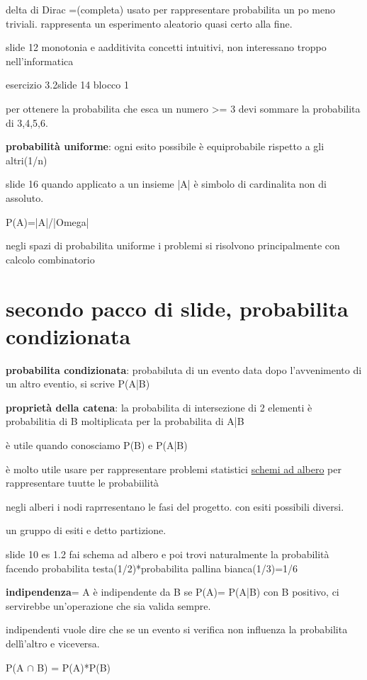 \documentclass[12pt]{article}
\begin{document}
delta di Dirac =(completa) usato per rappresentare probabilita un po meno triviali. rappresenta un esperimento aleatorio quasi certo alla fine.

slide 12 monotonia e aadditivita concetti intuitivi, non interessano troppo nell'informatica

esercizio 3.2slide 14 blocco 1

per ottenere la probabilita che esca un numero >= 3 devi sommare la probabilita di 3,4,5,6.

\textbf{probabilità uniforme}: ogni esito possibile è equiprobabile  rispetto a gli altri(1/n)

slide 16 quando applicato a un insieme |A| è simbolo di cardinalita non di assoluto.

P(A)=|A|/|Omega|


negli spazi di probabilita uniforme i problemi si risolvono principalmente con calcolo combinatorio

\section{secondo pacco di slide, probabilita condizionata}

\textbf{probabilita condizionata}: probabiluta di un evento data dopo l'avvenimento di un altro eventio, si scrive P(A|B)

\textbf{proprietà della catena}: la probabilita di intersezione di 2 elementi è probabilitia di B moltiplicata per la probabilita di A|B

è utile quando conosciamo P(B) e P(A|B)

è molto utile usare per rappresentare problemi statistici \underline{schemi ad albero} per rappresentare tuutte le probabiilità

negli alberi i nodi raprresentano le fasi del progetto. con esiti possibili diversi.

un gruppo di esiti e detto partizione.

slide 10 es 1.2 fai schema ad albero e poi trovi naturalmente la probabilità facendo probabilita testa(1/2)*probabilita pallina bianca(1/3)=1/6

\textbf{indipendenza}= A è indipendente da B se P(A)= P(A|B) con B positivo, ci servirebbe un'operazione che sia valida sempre.

indipendenti vuole dire che se un evento si verifica non influenza la probabilita dellì'altro e viceversa.

P(A $\cap$ B) = P(A)*P(B)
\end{document}
